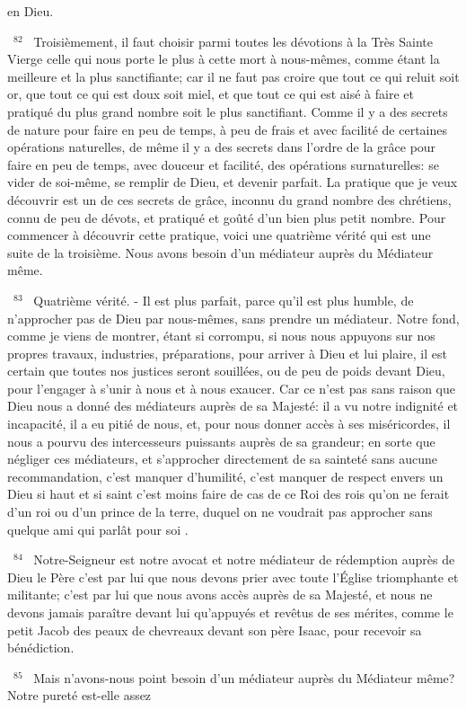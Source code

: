 \documentclass[paper=a5,pagesize=pdftex,fontsize=15pt,headinclude=on,twoside=off]{scrbook}
\newcommand{\negphantom}[1]{\settowidth{\dimen0}{#1}\hspace*{-\dimen0}}
\newcommand{\versenb}[1]{\par \vspace{10pt}~\negphantom{~${}^{#1}$~}${}^{#1}$~}
\begin{document}
en Dieu.
\versenb{82} Troisièmement, il faut choisir parmi toutes les dévotions à la Très Sainte Vierge celle qui nous porte le plus à
cette mort à nous-mêmes, comme étant la meilleure et la plus sanctifiante; car il ne faut pas croire que tout ce qui
reluit soit or, que tout ce qui est doux soit miel, et que tout ce qui est aisé à faire et pratiqué du plus grand nombre
soit le plus sanctifiant. Comme il y a des secrets de nature pour faire en peu de temps, à peu de frais et avec
facilité de certaines opérations naturelles, de même il y a des secrets dans l'ordre de la grâce pour faire en peu de
temps, avec douceur et facilité, des opérations surnaturelles: se vider de soi-même, se remplir de Dieu, et devenir
parfait.
La pratique que je veux découvrir est un de ces secrets de grâce, inconnu du grand nombre des chrétiens, connu
de peu de dévots, et pratiqué et goûté d'un bien plus petit nombre. Pour commencer à découvrir cette pratique,
voici une quatrième vérité qui est une suite de la troisième.
Nous avons besoin d'un médiateur auprès du Médiateur même.
\versenb{83} Quatrième vérité. - Il est plus parfait, parce qu'il est plus humble, de n'approcher pas de Dieu par nous-mêmes, sans prendre un médiateur. Notre fond, comme je viens de montrer, étant si corrompu, si nous nous
appuyons sur nos propres travaux, industries, préparations, pour arriver à Dieu et lui plaire, il est certain que toutes
nos justices seront souillées, ou de peu de poids devant Dieu, pour l'engager à s'unir à nous et à nous exaucer.
Car ce n'est pas sans raison que Dieu nous a donné des médiateurs auprès de sa Majesté: il a vu notre indignité
et incapacité, il a eu pitié de nous, et, pour nous donner accès à ses miséricordes, il nous a pourvu des
intercesseurs puissants auprès de sa grandeur; en sorte que négliger ces médiateurs, et s'approcher directement
de sa sainteté sans aucune recommandation, c'est manquer d'humilité, c'est manquer de respect envers un Dieu
si haut et si saint c'est moins faire de cas de ce Roi des rois qu'on ne ferait d'un roi ou d'un prince de la terre,
duquel on ne voudrait pas approcher sans quelque ami qui parlât pour soi .
\versenb{84} Notre-Seigneur est notre avocat et notre médiateur de rédemption auprès de Dieu le Père c'est par lui que
nous devons prier avec toute l'Église triomphante et militante; c'est par lui que nous avons accès auprès de sa
Majesté, et nous ne devons jamais paraître devant lui qu'appuyés et revêtus de ses mérites, comme le petit Jacob
des peaux de chevreaux devant son père Isaac, pour recevoir sa bénédiction.
\versenb{85} Mais n'avons-nous point besoin d'un médiateur auprès du Médiateur même? Notre pureté est-elle assez
\end{document}
